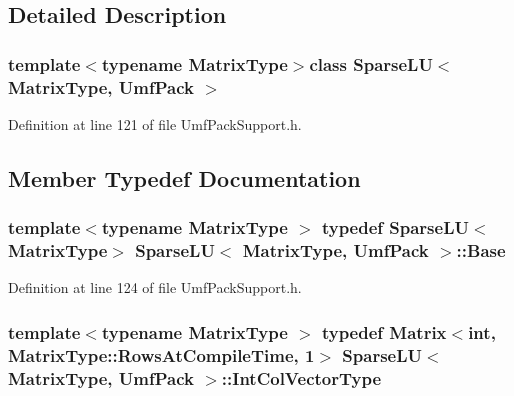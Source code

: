 \subsection{Detailed Description}
\subsubsection*{template$<$typename Matrix\-Type$>$class Sparse\-L\-U$<$ Matrix\-Type, Umf\-Pack $>$}



Definition at line 121 of file Umf\-Pack\-Support.\-h.



\subsection{Member Typedef Documentation}
\hypertarget{class_sparse_l_u_3_01_matrix_type_00_01_umf_pack_01_4_afbbcbc7752cbd01b9298422e8751598a}{
\subsubsection[{Base}]{\setlength{\rightskip}{0pt plus 5cm}template$<$typename Matrix\-Type $>$ typedef {\bf Sparse\-L\-U}$<$Matrix\-Type$>$ {\bf Sparse\-L\-U}$<$ Matrix\-Type, {\bf Umf\-Pack} $>$\-::{\bf Base}\hspace{0.3cm}{\ttfamily [protected]}}}\label{class_sparse_l_u_3_01_matrix_type_00_01_umf_pack_01_4_afbbcbc7752cbd01b9298422e8751598a}


Definition at line 124 of file Umf\-Pack\-Support.\-h.

\hypertarget{class_sparse_l_u_3_01_matrix_type_00_01_umf_pack_01_4_af06161423c3dde25ec3431a7e87b66e8}{
\subsubsection[{Int\-Col\-Vector\-Type}]{\setlength{\rightskip}{0pt plus 5cm}template$<$typename Matrix\-Type $>$ typedef {\bf Matrix}$<${\bf int}, Matrix\-Type\-::\-Rows\-At\-Compile\-Time, 1$>$ {\bf Sparse\-L\-U}$<$ Matrix\-Type, {\bf Umf\-Pack} $>$\-::{\bf Int\-Col\-Vector\-Type}\hspace{0.3cm}{\ttfamily [protected]}}}\label{class_sparse_l_u_3_01_matrix_type_00_01_umf_pack_01_4_af06161423c3dde25ec3431a7e87b66e8}


